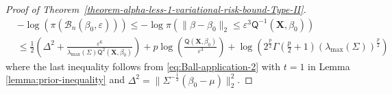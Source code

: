 \documentclass[12pt]{article}
\numberwithin{equation}{section}
\begin{document}
\begin{proof}[Proof of Theorem~\ref{theorem-alpha-less-1-variational-risk-bound-Type-II}]
\begin{equation}\label{eq:proof-theorem1-41}
\begin{split}
&-\log (\pi\left(\mathcal{B}_n(\beta_0, \varepsilon)\right))
\leq -\log \pi\left(\lVert\beta - \beta_0\rVert_2 \leq \varepsilon^3\mathsf{Q}^{-1}(\mathbf{X}, \beta_0)\right)\\
&\leq \frac{1}{2}\left(\Delta^2 + \frac{\varepsilon^6}{\lambda_{\mathrm{max}}(\Sigma)\mathsf{Q}^{2}(\mathbf{X}, \beta_0)}\right) + p\log\left(\frac{\mathsf{Q}(\mathbf{X},\beta_0)}{\varepsilon^3}\right) + \log\left(2^{\frac{p}{2}}\Gamma\left(\frac{p}{2}+1\right)(\lambda_{\mathrm{max}}(\Sigma))^{\frac{p}{2}}\right)
\end{split}
\end{equation}
%
where the last inequality follows from \eqref{eq:Ball-application-2} with $t=1$ in Lemma \ref{lemma:prior-inequality} and $\Delta^{2} = \lVert \Sigma^{-\frac{1}{2}}(\beta_0-\mu)\rVert_{2}^{2}$. 


\end{proof}
\end{document}
